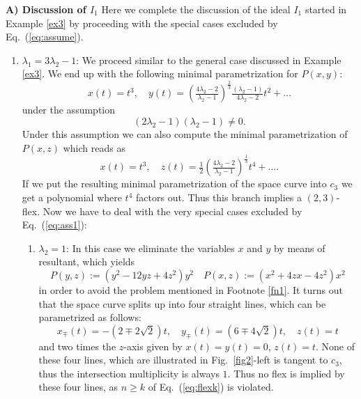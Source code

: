 \documentclass{svproc}
\begin{document}
{\bf A) Discussion of $I_1$} \newline
Here we complete the discussion of the ideal $I_1$ started in Example \ref{ex3} by proceeding with the 
special cases excluded by  Eq.\ (\ref{eq:assume}).
\begin{enumerate}
\item 
$\lambda_1 = 3\lambda_2 - 1$: We proceed similar to the general case discussed in  Example \ref{ex3}. We end up with the following minimal parametrization for $P(x,y)$:
\begin{equation}
x(t)=t^3, \quad
y(t)=
    \left(\tfrac{4\lambda_2 - 2}{\lambda_2 - 1}\right)^{\tfrac{2}{3}}\tfrac{(\lambda_2 - 1)}{4\lambda_2 - 2}t^2+\ldots
\end{equation}
under the assumption 
\begin{equation}\label{eq:ass1}
    (2\lambda_2-1)(\lambda_2-1)\neq 0.
\end{equation}
Under this assumption we can also compute the minimal parametrization of $P(x,z)$ which reads as
\begin{equation}
x(t)=t^3, \quad z(t)=
\tfrac{1}{2}\left(\tfrac{4\lambda_2 - 2}{\lambda_2 - 1}\right)^{\tfrac{1}{3}} t^4+\ldots .
\end{equation}
If we put the resulting minimal parametrization of the space curve into $c_3$ we get a polynomial where $t^4$ factors out. Thus this branch implies a $(2,3)$-flex. Now we have to deal with the very special cases excluded by Eq.\ (\ref{eq:ass1}):
    \begin{enumerate}
        \item 
        $\lambda_2=1$: In this case we eliminate  the variables $x$ and $y$ by means of resultant, which yields
        \begin{equation}
            P(y,z):=(y^2 - 12yz + 4z^2)y^2 \quad
            P(x,z):=(x^2+4 z x-4 z^2) x^2
        \end{equation}
        in order to avoid the problem mentioned in Footnote \ref{fn1}. 
        It turns out that the space curve splits up into four straight lines, which can be parametrized as follows:
        \begin{equation}
        x_\mp(t) =-(2\mp 2\sqrt{2})t,\quad
        y_\mp(t)=(6\mp4\sqrt{2})t, \quad z(t)=t    
        \end{equation}
        and two times the $z$-axis given by $x(t)=y(t)=0$, $z(t)=t$. None of these four lines, which are illustrated in Fig.\ \ref{fig2}-left is tangent to $c_3$, thus the intersection multiplicity is always $1$. Thus no flex is implied by these four lines, as $n\geq k$ of Eq.\ (\ref{eq:flexk}) is violated.

\end{enumerate}
\end{enumerate}
\end{document}
